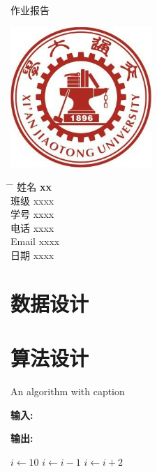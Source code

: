 \documentclass[UTF8]{ctexart}
\begin{document}
\begin{titlepage}
    \begin{center}
        \Huge{作业报告}
        \noindent{\color{BrickRed} \rule{\linewidth}{1mm}}
        \Huge
        \vspace{0.5cm}
		\LARGE
		\vspace{1.5cm}
		\textbf{}

        \includegraphics[width=0.4\textwidth]{school_emblem.png}

        \vspace{1.5cm}
    \end{center}
    \Large
    \begin{tabbing}
        \hspace*{1em}\= \hspace*{8em} \= \kill %
        \> 姓名 \>  \textbf{xx} \\
        \> 班级 \>  xxxx \\
        \> 学号 \>  xxxx  \\
        \> 电话  \> xxxx \\
        \> Email \> xxxx \\
        \> 日期 \>  xxxx
    \end{tabbing}
    
\end{titlepage}
\setlength{\headheight}{22pt}
\tableofcontents
\newpage{}
\section{数据设计}

\section{算法设计}
\listofalgorithms{}

\begin{algorithm}[H]
\caption{An algorithm with caption}\label{alg:cap}
\hspace{\algorithmicindent}\textbf{输入:}

\hspace{\algorithmicindent}\textbf{输出:}
\begin{algorithmic}
    \State{}\(i \gets 10\)
        \State{}\(i \gets i-1\)
    \Else{}
            \State{}\(i \gets i+2\)
        \EndIf{}
    \EndIf{}
\end{algorithmic}
\end{algorithm}
\end{document}

